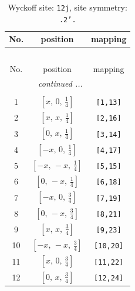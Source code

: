 \documentclass[fleqn,8pt]{jsarticle}
\begin{document}
\begin{longtable}{ccc}
\caption{Wyckoff site: {\tt 12j}, site symmetry: {\tt .2'.}}
 \\
 \hline \hline
No. & position & mapping \\ \hline \endfirsthead

\multicolumn{2}{l}{\tablename\ \thetable{}} \\
 \hline \hline
No. & position & mapping \\ \hline \endhead

 \hline \hline
\multicolumn{2}{r}{\footnotesize\it continued ...} \\ \endfoot

 \hline \hline
\multicolumn{2}{r}{} \\ \endlastfoot

1 & $\left[ x,\, 0,\, \frac{1}{4} \right]$ & {\tt [1,13]} \\ \hline
2 & $\left[ x,\, x,\, \frac{1}{4} \right]$ & {\tt [2,16]} \\ \hline
3 & $\left[ 0,\, x,\, \frac{1}{4} \right]$ & {\tt [3,14]} \\ \hline
4 & $\left[ - x,\, 0,\, \frac{1}{4} \right]$ & {\tt [4,17]} \\ \hline
5 & $\left[ - x,\, - x,\, \frac{1}{4} \right]$ & {\tt [5,15]} \\ \hline
6 & $\left[ 0,\, - x,\, \frac{1}{4} \right]$ & {\tt [6,18]} \\ \hline
7 & $\left[ - x,\, 0,\, \frac{3}{4} \right]$ & {\tt [7,19]} \\ \hline
8 & $\left[ 0,\, - x,\, \frac{3}{4} \right]$ & {\tt [8,21]} \\ \hline
9 & $\left[ x,\, x,\, \frac{3}{4} \right]$ & {\tt [9,23]} \\ \hline
10 & $\left[ - x,\, - x,\, \frac{3}{4} \right]$ & {\tt [10,20]} \\ \hline
11 & $\left[ x,\, 0,\, \frac{3}{4} \right]$ & {\tt [11,22]} \\ \hline
12 & $\left[ 0,\, x,\, \frac{3}{4} \right]$ & {\tt [12,24]} \\
\end{longtable}
\renewcommand{\arraystretch}{1.2}
\end{document}
